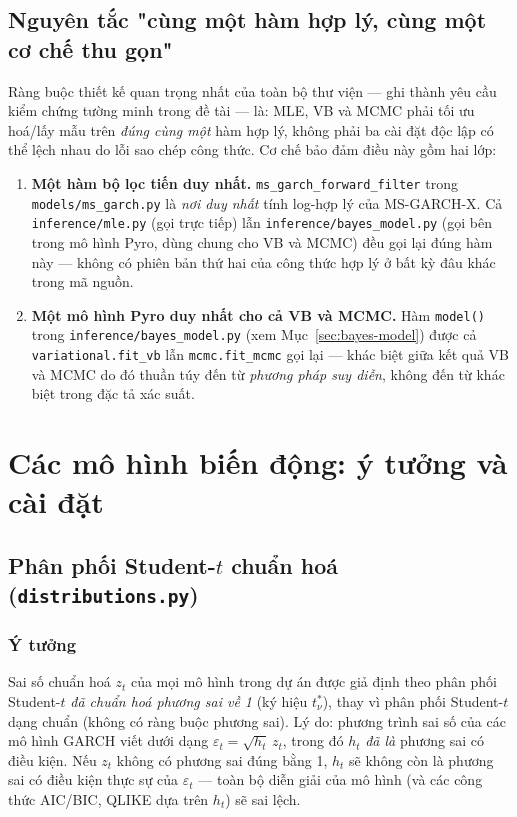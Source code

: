 \documentclass[11pt,a4paper]{article}
\newcommand{\code}[1]{\texttt{#1}}
\newcommand{\file}[1]{\texttt{#1}}
\begin{document}
\subsection{Nguyên tắc "cùng một hàm hợp lý, cùng một cơ chế thu gọn"}

Ràng buộc thiết kế quan trọng nhất của toàn bộ thư viện --- ghi thành yêu cầu kiểm
chứng tường minh trong đề tài --- là: MLE, VB và MCMC phải tối ưu hoá/lấy mẫu trên
\emph{đúng cùng một} hàm hợp lý, không phải ba cài đặt độc lập có thể lệch nhau do
lỗi sao chép công thức. Cơ chế bảo đảm điều này gồm hai lớp:

\begin{enumerate}
  \item \textbf{Một hàm bộ lọc tiến duy nhất.} \code{ms\_garch\_forward\_filter}
    trong \code{models/ms\_garch.py} là \emph{nơi duy nhất} tính log-hợp lý của
    MS-GARCH-X. Cả \code{inference/mle.py} (gọi trực tiếp) lẫn
    \code{inference/bayes\_model.py} (gọi bên trong mô hình Pyro, dùng chung cho VB
    và MCMC) đều gọi lại đúng hàm này --- không có phiên bản thứ hai của công thức
    hợp lý ở bất kỳ đâu khác trong mã nguồn.
  \item \textbf{Một mô hình Pyro duy nhất cho cả VB và MCMC.} Hàm \code{model()} trong
    \code{inference/bayes\_model.py} (xem Mục~\ref{sec:bayes-model}) được cả
    \code{variational.fit\_vb} lẫn \code{mcmc.fit\_mcmc} gọi lại --- khác biệt giữa
    kết quả VB và MCMC do đó thuần túy đến từ \emph{phương pháp suy diễn}, không đến
    từ khác biệt trong đặc tả xác suất.
\end{enumerate}

\section{Các mô hình biến động: ý tưởng và cài đặt}

\subsection{Phân phối Student-$t$ chuẩn hoá (\file{distributions.py})}

\subsubsection{Ý tưởng}

Sai số chuẩn hoá $z_t$ của mọi mô hình trong dự án được giả định theo phân phối
Student-$t$ \emph{đã chuẩn hoá phương sai về 1} (ký hiệu $t^*_\nu$), thay vì phân
phối Student-$t$ dạng chuẩn (không có ràng buộc phương sai). Lý do: phương trình sai
số của các mô hình GARCH viết dưới dạng $\varepsilon_t = \sqrt{h_t}\, z_t$, trong đó
$h_t$ \emph{đã là} phương sai có điều kiện. Nếu $z_t$ không có phương sai đúng bằng 1,
$h_t$ sẽ không còn là phương sai có điều kiện thực sự của $\varepsilon_t$ --- toàn bộ
diễn giải của mô hình (và các công thức AIC/BIC, QLIKE dựa trên $h_t$) sẽ sai lệch.
\end{document}
